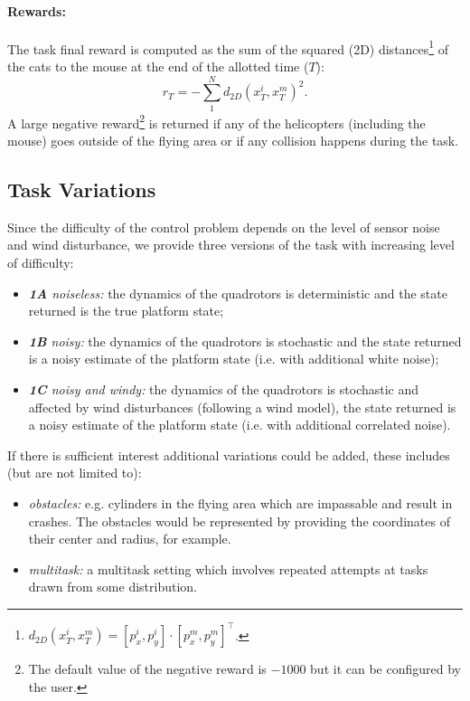\documentclass{article}
\begin{document}
\paragraph{Rewards:}
The task final reward is computed as the sum of the squared (2D) distances\footnote{$d_{2D}(x^i_T,x^m_T) = [p^i_x,p^i_y]\cdot[p^m_x,p^m_y]^\intercal$.} of the cats to the mouse at the end of the allotted time ($T$):
$$r_T = - \sum^N_1 d_{2D}(x^i_T,x^m_T)^2.$$
A large negative reward\footnote{The default value of the negative reward is $-1000$ but it can be configured by the user.} is returned if any of the helicopters (including the mouse) goes outside of the flying area or if any collision happens during the task.

\subsection{Task Variations} \label{CatMouseVariations}
 Since the difficulty of the control problem depends on the level of sensor noise and wind disturbance, we provide three versions of the task with increasing level of difficulty:
\begin{itemize}
 \item \textit{\textbf{1A} noiseless:} the dynamics of the quadrotors is deterministic and the state returned is the true platform state;
 \item \textit{\textbf{1B} noisy:} the dynamics of the quadrotors is stochastic and the state returned is a noisy estimate of the platform state (i.e. with additional white noise);
 \item \textit{\textbf{1C} noisy and windy:} the dynamics of the quadrotors is stochastic and affected by wind disturbances (following a wind model), the state returned is a noisy estimate of the platform state (i.e. with additional correlated noise).
\end{itemize}

If there is sufficient interest additional variations could be added, these includes (but are not limited to):
\begin{itemize} 
\item \textit{obstacles:} e.g. cylinders in the flying area which are impassable and result in crashes. The obstacles would be represented by providing the coordinates of their center and radius, for example.
\item \textit{multitask:} a multitask setting which involves repeated attempts at tasks drawn from some distribution.
\end{itemize}
\end{document}
